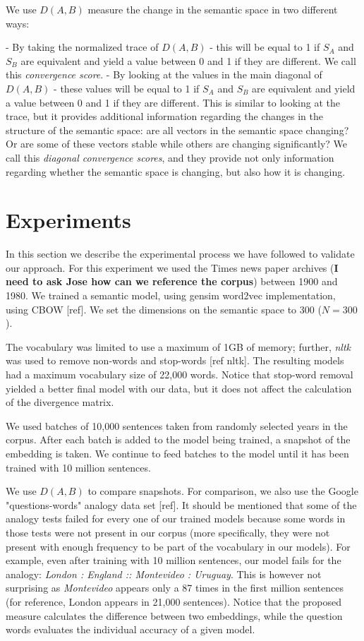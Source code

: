 \documentclass{article} %
\begin{document}
We use $D(A,B)$ measure the change in the semantic space in two different ways:

 - By taking the normalized trace of $D(A,B)$ - this will be equal to 1 if $S_A$ and $S_B$ are equivalent and yield a value between 0 and 1 if they are different. We call this \textit{convergence score}.
 - By looking at the values in the main diagonal of $D(A,B)$ - these values will be equal to 1 if $S_A$ and $S_B$ are equivalent and yield a value between 0 and 1 if they are different. This is similar to looking at the trace, but it provides additional information regarding the changes in the structure of the semantic space: are all vectors in the semantic space changing? Or are some of these vectors stable while others are changing significantly? We call this \textit{diagonal convergence scores}, and they provide not only information regarding whether the semantic space is changing, but also how it is changing.

\section{Experiments}
\label{sec:experiments}
In this section we describe the experimental process we have followed to validate our approach. For this experiment we used the Times news paper archives (\textbf{I need to ask Jose how can we reference the corpus}) between 1900 and 1980. We trained a semantic model, using gensim word2vec implementation, using CBOW [ref]. We set the dimensions on the semantic space to 300 ($N = 300$).

The vocabulary was limited to use a maximum of 1GB of memory; further, \textit{nltk} was used to remove non-words and stop-words [ref nltk]. The resulting models had a maximum vocabulary size of 22,000 words. Notice that stop-word removal yielded a better final model with our data, but it does not affect the calculation of the divergence matrix.

We used batches of 10,000 sentences taken from randomly selected years in the corpus. After each batch is added to the model being trained, a snapshot of the embedding is taken. We continue to feed batches to the model until it has been trained with 10 million sentences.

We use $D(A,B)$ to compare snapshots. For comparison, we also use the Google "questions-words" analogy data set [ref]. It should be mentioned that some of the analogy tests failed for every one of our trained models because some words in those tests were not present in our corpus (more specifically, they were not present with enough frequency to be part of the vocabulary in our models). For example, even after training with 10 million sentences, our model fails for the analogy: \textit{London : England :: Montevideo : Uruguay}. This is however not surprising as \textit{Montevideo} appears only a 87 times in the first million sentences (for reference, London appears in 21,000 sentences). Notice that the proposed measure calculates the difference between two embeddings, while the question words evaluates the individual accuracy of a given model.
\end{document}
